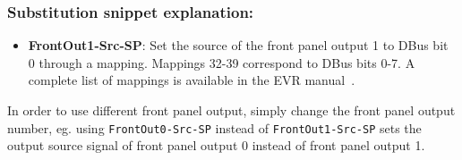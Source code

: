 \documentclass[12pt,a4paper]{article}
\begin{document}
\subsubsection{Substitution snippet explanation:}
\begin{itemize}
	\item \textbf{FrontOut1-Src-SP}: Set the source of the front panel output 1  to DBus bit 0 through a mapping. Mappings 32-39 correspond to DBus bits 0-7. A complete list of mappings is available in the EVR manual~\cite{evr_manual}.
\end{itemize}

In order to use different front panel output, simply change the front panel output number, eg. using \texttt{FrontOut0-Src-SP} instead of \texttt{FrontOut1-Src-SP} sets the output source signal of front panel output 0 instead of front panel output 1.



\end{document}
